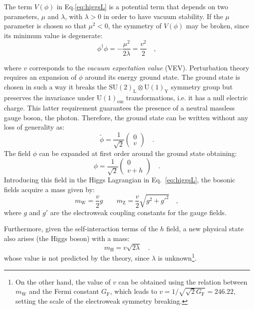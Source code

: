 The term $V(\phi)$ in Eq.\eqref{eq:higgsL} is a potential term that depends on two parameters, $\mu$ and $\lambda$, with $\lambda>0$ in order to have vacuum stability. If the $\mu$ parameter is chosen so that $\mu^2<0$, the symmetry of $V(\phi)$ may be broken, since its minimum value is degenerate:
\begin{equation}
\phi^\dagger\phi = -\frac{\mu^2}{2\lambda} = \frac{v^2}{2} \quad ,
\end{equation}

\noindent where $v$ corresponds to the \emph{vacuum expectation value} (VEV). Perturbation theory requires an expansion of $\phi$ around its energy ground state. The ground state is chosen in such a way it  breaks the $\mathrm{SU(2)_L \otimes U(1)_Y}$ symmetry group but preserves the invariance under $\mathrm{U(1)_{em}}$ transformations, i.e. it has a null electric charge. This latter requirement guarantees the presence of a neutral massless gauge boson, the photon. Therefore, the ground state can be written without any loss of generality as:
\begin{equation}
\tilde{\phi} = \frac{1}{\sqrt{2}} \begin{pmatrix} 0 \\ v   \end{pmatrix}\quad .
\end{equation}
The field $\phi$ can be expanded at first order around the ground state obtaining:
\begin{equation}
\phi = \frac{1}{\sqrt{2}} \begin{pmatrix} 0 \\ v+h   \end{pmatrix}\quad .
\end{equation}
Introducing this field in the Higgs Lagrangian in Eq.~\eqref{eq:higgsL}, the bosonic fields acquire a mass given by:
\begin{equation}
m_\mathrm{W} = \frac{v}{2}g \qquad m_\mathrm{Z} = \frac{v}{2}\sqrt{g^2 +g'^2} \quad,
\end{equation}
\noindent where $g$ and $g'$ are the electroweak coupling constants for the gauge fields.

Furthermore, given the self-interaction terms of the $h$ field, a new physical state also arises (the Higgs boson) with a mass:
\begin{equation}
m_\mathrm{H} = v\sqrt{2\lambda} \quad.
\end{equation}
\noindent whose value is not predicted by the theory, since $\lambda$ is unknown\footnote{On the other hand, the value of $v$ can be obtained using the relation between $m_\mathrm{W}$ and the Fermi constant $G_\mathrm{F}$, which leads to $v = 1/\sqrt{\sqrt{2}G_\mathrm{F}} = 246.22$\GeV, setting the scale of the electroweak symmetry breaking.}.


